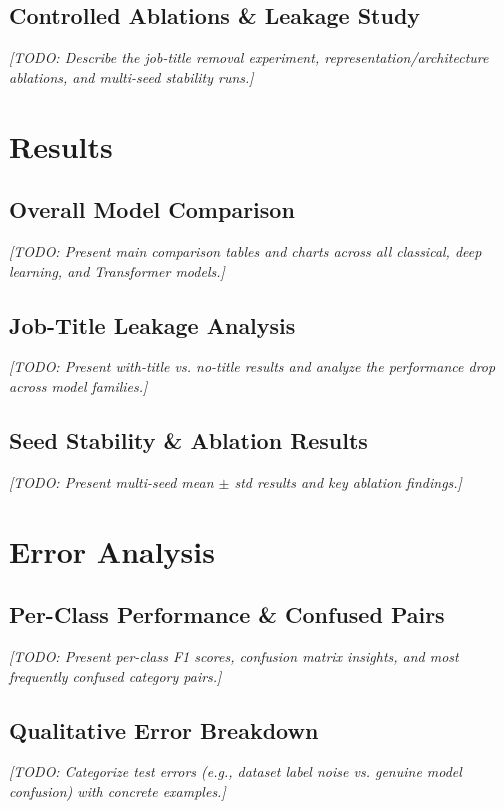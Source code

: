 \documentclass[11pt,a4paper]{article}
\begin{document}
\subsection{Controlled Ablations \& Leakage Study}
\par\noindent\textit{[TODO: Describe the job-title removal experiment, representation/architecture ablations, and multi-seed stability runs.]}

\section{Results}
\subsection{Overall Model Comparison}
\par\noindent\textit{[TODO: Present main comparison tables and charts across all classical, deep learning, and Transformer models.]}

\subsection{Job-Title Leakage Analysis}
\par\noindent\textit{[TODO: Present with-title vs. no-title results and analyze the performance drop across model families.]}

\subsection{Seed Stability \& Ablation Results}
\par\noindent\textit{[TODO: Present multi-seed mean $\pm$ std results and key ablation findings.]}

\section{Error Analysis}
\subsection{Per-Class Performance \& Confused Pairs}
\par\noindent\textit{[TODO: Present per-class F1 scores, confusion matrix insights, and most frequently confused category pairs.]}

\subsection{Qualitative Error Breakdown}
\par\noindent\textit{[TODO: Categorize test errors (e.g., dataset label noise vs. genuine model confusion) with concrete examples.]}
\end{document}
